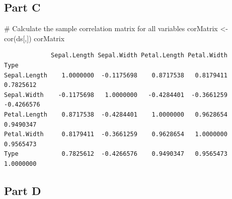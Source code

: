 \documentclass[
  letterpaper,
  DIV=11,
  numbers=noendperiod]{scrartcl}
\newenvironment{Shaded}{}{}
\newcommand{\CommentTok}[1]{\textcolor[rgb]{0.57,0.51,0.45}{#1}}
\newcommand{\DecValTok}[1]{\textcolor[rgb]{0.96,0.45,0.00}{#1}}
\newcommand{\FunctionTok}[1]{\textcolor[rgb]{0.41,0.62,0.42}{#1}}
\newcommand{\NormalTok}[1]{\textcolor[rgb]{0.24,0.22,0.21}{#1}}
\newcommand{\OtherTok}[1]{\textcolor[rgb]{0.41,0.62,0.42}{#1}}
\newcommand{\SpecialCharTok}[1]{\textcolor[rgb]{0.69,0.38,0.53}{#1}}
\begin{document}
\begin{Shaded}
\end{Shaded}

\newpage{}

\hypertarget{part-c-3}{%
\subsection{Part C}\label{part-c-3}}

\begin{Shaded}
\begin{Highlighting}[]
\CommentTok{\# Calculate the sample correlation matrix for all variables}
\NormalTok{corMatrix }\OtherTok{\textless{}{-}} \FunctionTok{cor}\NormalTok{(ds[,])}
\NormalTok{corMatrix}
\end{Highlighting}
\end{Shaded}

\begin{verbatim}
             Sepal.Length Sepal.Width Petal.Length Petal.Width       Type
Sepal.Length    1.0000000  -0.1175698    0.8717538   0.8179411  0.7825612
Sepal.Width    -0.1175698   1.0000000   -0.4284401  -0.3661259 -0.4266576
Petal.Length    0.8717538  -0.4284401    1.0000000   0.9628654  0.9490347
Petal.Width     0.8179411  -0.3661259    0.9628654   1.0000000  0.9565473
Type            0.7825612  -0.4266576    0.9490347   0.9565473  1.0000000
\end{verbatim}

\newpage{}

\hypertarget{part-d-2}{%
\subsection{Part D}\label{part-d-2}}
\end{document}
